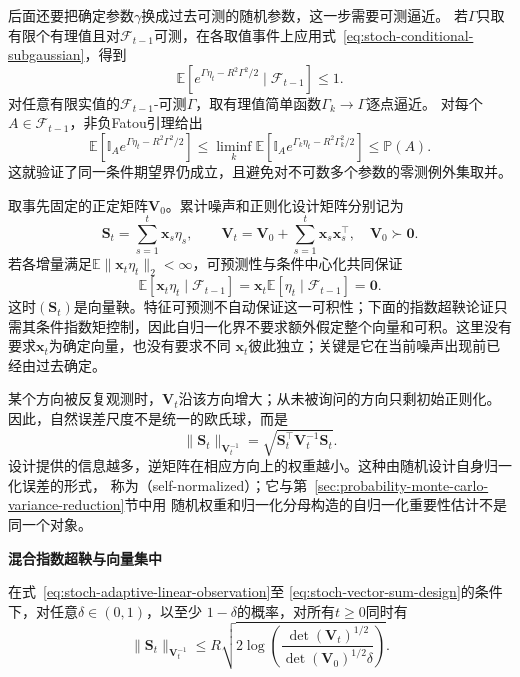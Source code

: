 后面还要把确定参数\(\gamma\)换成过去可测的随机参数，这一步需要可测逼近。
若\(\Gamma\)只取有限个有理值且对\(\mathcal F_{t-1}\)可测，在各取值事件上应用式~\eqref{eq:stoch-conditional-subgaussian}，得到
\[
 \mathbb E\!\left[
 e^{\Gamma\eta_t-R^2\Gamma^2/2}\mid\mathcal F_{t-1}
 \right]\leq1.
\]
对任意有限实值的\(\mathcal F_{t-1}\)-可测\(\Gamma\)，取有理值简单函数\(\Gamma_k\to\Gamma\)逐点逼近。
对每个\(A\in\mathcal F_{t-1}\)，非负Fatou引理给出
\[
 \mathbb E[\mathbb I_A e^{\Gamma\eta_t-R^2\Gamma^2/2}]
 \leq\liminf_k
 \mathbb E[\mathbb I_A e^{\Gamma_k\eta_t-R^2\Gamma_k^2/2}]
 \leq\mathbb P(A).
\]
这就验证了同一条件期望界仍成立，且避免对不可数多个参数的零测例外集取并。

取事先固定的正定矩阵\(\bm V_0\)。累计噪声和正则化设计矩阵分别记为
\begin{equation}
  \bm{S}_t=\sum_{s=1}^{t}\bm{x}_s\eta_s,
  \qquad
  \bm{V}_t=\bm{V}_0+\sum_{s=1}^{t}\bm{x}_s\bm{x}_s^{\top},
  \quad\bm{V}_0\succ\bm{0}.
  \label{eq:stoch-vector-sum-design}
\end{equation}
若各增量满足\(\mathbb E\lVert\bm x_t\eta_t\rVert_2<\infty\)，可预测性与条件中心化共同保证
\[
  \mathbb{E}[\bm{x}_t\eta_t\mid\mathcal{F}_{t-1}]
  =
  \bm{x}_t
  \mathbb{E}[\eta_t\mid\mathcal{F}_{t-1}]
  =\bm{0}.
\]
这时$(\bm{S}_t)$是向量鞅。特征可预测不自动保证这一可积性；下面的指数超鞅论证只需其条件指数矩控制，因此自归一化界不要求额外假定整个向量和可积。这里没有要求$\bm{x}_t$为确定向量，也没有要求不同
$\bm{x}_t$彼此独立；关键是它在当前噪声出现前已经由过去确定。

某个方向被反复观测时，$\bm{V}_t$沿该方向增大；从未被询问的方向只剩初始正则化。
因此，自然误差尺度不是统一的欧氏球，而是
\[
  \lVert\bm{S}_t\rVert_{\bm{V}_t^{-1}}
  =\sqrt{\bm{S}_t^{\top}\bm{V}_t^{-1}\bm{S}_t}.
\]
设计提供的信息越多，逆矩阵在相应方向上的权重越小。这种由随机设计自身归一化误差的形式，
称为（self-normalized）；它与第~\ref{sec:probability-monte-carlo-variance-reduction}节中用
随机权重和归一化分母构造的自归一化重要性估计不是同一个对象。

\par\medskip\noindent\textbf{混合指数超鞅与向量集中}\quad
\begin{theorem}[向量自归一化集中界]
  \label{thm:stoch-vector-self-normalized}
  在式~\eqref{eq:stoch-adaptive-linear-observation}至
  \eqref{eq:stoch-vector-sum-design}的条件下，对任意$\delta\in(0,1)$，以至少
  $1-\delta$的概率，对所有$t\geq0$同时有
  \begin{equation}
    \lVert\bm{S}_t\rVert_{\bm{V}_t^{-1}}
    \leq
    R\sqrt{
      2\log\left(
        \frac{\det(\bm{V}_t)^{1/2}}
             {\det(\bm{V}_0)^{1/2}\delta}
      \right)
    }.
    \label{eq:stoch-vector-self-normalized-bound}
  \end{equation}
\end{theorem}

